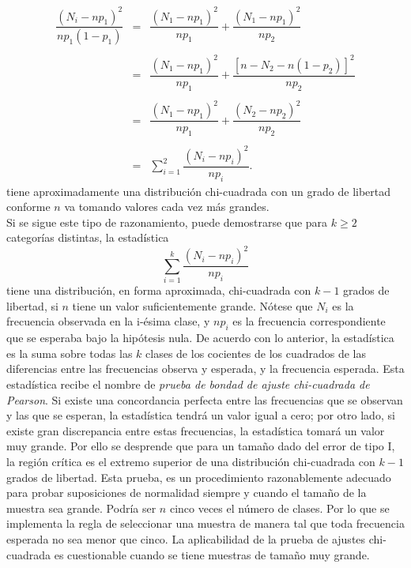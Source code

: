 $$
\begin{array}{rcl}
    \dfrac{\left(N_i-np_1\right)^2}{np_1(1-p_1)} &=& \dfrac{\left(N_1-np_1\right)^2}{np_1}+\dfrac{\left(N_1-np_1\right)^2}{np_2}\\\\
						 &=& \dfrac{\left(N_1-np_1\right)^2}{np_1}+\dfrac{\left[n-N_2-n(1-p_2)\right]^2}{np_2}\\\\
						 &=& \dfrac{\left(N_1-np_1\right)^2}{np_1}+\dfrac{\left(N_2-np_2\right)^2}{np_2}\\\\
						 &=& \displaystyle\sum_{i=1}^2 \dfrac{\left(N_i-np_i\right)^2}{np_i}.
\end{array}
$$
tiene aproximadamente una distribución chi-cuadrada con un grado de libertad conforme $n$ va tomando valores cada vez más grandes.\\
Si se sigue este tipo de razonamiento, puede demostrarse que para $k\geq 2$ categorías distintas, la estadística
$$\sum_{i=1}^k \dfrac{\left(N_i-np_i\right)^2}{np_i}$$
tiene una distribución, en forma aproximada, chi-cuadrada con $k-1$ grados de libertad, si $n$ tiene un valor suficientemente grande. Nótese que $N_i$ es la frecuencia observada en la i-ésima clase, y $np_i$ es la frecuencia correspondiente que se esperaba bajo la hipótesis nula. De acuerdo con lo anterior, la estadística es la suma sobre todas las $k$ clases de los cocientes de los cuadrados de las diferencias entre las frecuencias observa y esperada, y la frecuencia esperada. Esta estadística recibe el nombre de \textit{prueba de bondad de ajuste chi-cuadrada de Pearson}. Si existe una concordancia perfecta entre las frecuencias que se observan y las que se esperan, la estadística tendrá un valor igual a cero; por otro lado, si existe gran discrepancia entre estas frecuencias, la estadística tomará un valor muy grande. Por ello se desprende que para un tamaño dado del error de tipo I, la región crítica es el extremo superior de una distribución chi-cuadrada con $k-1$ grados de libertad. Esta prueba, es un procedimiento razonablemente  adecuado para probar suposiciones de normalidad siempre y cuando el tamaño de la muestra sea grande. Podría ser $n$ cinco veces el número de clases. Por lo que se implementa la regla de seleccionar una muestra de manera tal que toda frecuencia esperada no sea menor que cinco. La aplicabilidad de la prueba de ajustes chi-cuadrada es cuestionable cuando se tiene muestras de tamaño muy grande.

